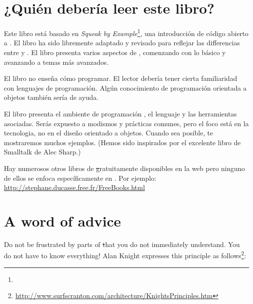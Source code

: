 \documentclass[a4paper,spanish, 10pt,twoside]{book}
\begin{document}
\section*{¿Quién debería leer este libro?}

Este libro está basado en \emph{Squeak by Example}\footnote{\sbe}, una introducción de código abierto a \squeak.
El libro ha sido libremente adaptado y revisado para reflejar las differencias entre \pharo y \squeak.
El libro presenta varios aspectos de \pharo, comenzando con lo básico y avanzando a temas más avanzados.

El libro no enseña cómo programar. El lector debería tener cierta familiaridad con lenguajes de programación. Algún conocimiento de programación orientada a objetos también sería de ayuda.

El libro presenta el ambiente de programación \pharo, el lenguaje y las herramientas asociadas. Serás expuesto a modismos y prácticas comunes, pero el foco está en la tecnologia, no en el diseño orientado a objetos. Cuando sea posible, te mostraremos muchos ejemplos. (Hemos sido inspirados por el excelente libro de Smalltalk\cite{Shar97a} de Alec Sharp.)

Hay numerosos otros libros  de \st gratuitamente disponibles en la web pero ninguno de ellos se enfoca específicamente en \pharo. Por ejemplo:
\url{http://stephane.ducasse.free.fr/FreeBooks.html}

\ifluluelse{}{\newpage} %
\section*{A word of advice}


Do not be frustrated by parts of \st that you do not immediately understand.
You do not have to know everything!
Alan Knight expresses this principle as follows\footnote{\url{http://www.surfscranton.com/architecture/KnightsPrinciples.htm}}:
\end{document}
